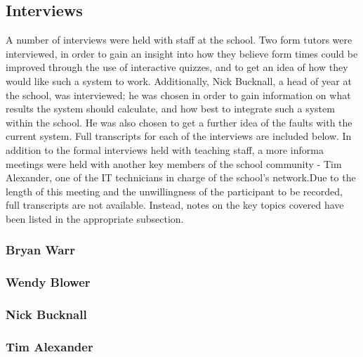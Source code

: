 \subsection{Interviews}
A number of interviews were held with staff at the school. Two form tutors were interviewed, in order to gain an insight into how they believe form times could be improved through the use of interactive quizzes, and to get an idea of how they would like such a system to work. Additionally, Nick Bucknall, a head of year at the school, was interviewed; he was chosen in order to gain information on what results the system should calculate, and how best to integrate such a system within the school. He was also chosen to get a further idea of the faults with the current system. Full transcripts for each of the interviews are included below. In addition to the formal interviews held with teaching staff, a more informa meetings were held with another key members of the school community - Tim Alexander, one of the IT technicians in charge of the school's network.Due to the length of this meeting and the unwillingness of the participant to be recorded, full transcripts are not available. Instead, notes on the key topics covered have been listed in the appropriate subsection.

\subsubsection{Bryan Warr}


\subsubsection{Wendy Blower}


\subsubsection{Nick Bucknall}


\subsubsection{Tim Alexander}


